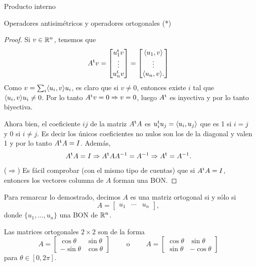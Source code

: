 \begin{chapter}{Producto interno}
\begin{section}{Operadores antisim\'etricos y operadores ortogonales (*)}
\begin{proof}
            
            Si $v \in \mathbb R^n$, tenemos que 
            $$
            A^{{\operatorname{t}}}v = \begin{bmatrix}
            u_1^{{\operatorname{t}}}v \\ \vdots \\ u_n^{{\operatorname{t}}}v 
            \end{bmatrix} = 
            \begin{bmatrix}
            \langle u_1, v \rangle \\ \vdots \\ \langle u_n, v \rangle.
            \end{bmatrix}
            $$
            Como $v = \sum_i \langle u_i, v \rangle u_i$, es claro que si $v \ne 0$, entonces existe $i$ tal que $\langle u_i, v \rangle u_i \ne 0$. Por lo tanto $A^{{\operatorname{t}}}v=0 \Rightarrow v=0$, luego $A^{{\operatorname{t}}}$  es inyectiva y por lo tanto biyectiva.
            
        Ahora bien,  el coeficiente $ij$  de la matriz $A^{{\operatorname{t}}}A$ es $u_i^{{\operatorname{t}}}u_j = \langle u_i,u_j\rangle$ que es 1 si $i=j$ y 0 si $i\ne j$. Es decir los únicos coeficientes no nulos son los de la diagonal y valen 1 y por lo tanto $A^{{\operatorname{t}}}A=I$. Además, $$A^{{\operatorname{t}}}A = I \Rightarrow A^{{\operatorname{t}}}AA^{-1} = A^{-1} \Rightarrow A^{{\operatorname{t}}} = A^{-1}.$$ 
        
        ($\Rightarrow$) Es fácil comprobar (con el mismo tipo de cuentas) que si $A^{{\operatorname{t}}}A=I$, entonces los vectores columna de $A$ forman una BON.
        
        \end{proof}
        
        Para remarcar lo demostrado, decimos  $A$ es una matriz ortogonal si y sólo si
        $$ A = \begin{bmatrix}
        u_1 & \cdots & u_n
        \end{bmatrix}, 
        $$
        donde  $\{u_1,\ldots,u_n\}$ una BON de $\mathbb R^n$.
        
        \begin{ejemplo*}
            Las matrices ortogonales $2 \times 2$ son de la forma
            $$
            A = \begin{bmatrix}
            \cos\theta &\sin\theta \\
            -\sin\theta & \cos\theta
            \end{bmatrix} \qquad\text{ o }\qquad 
            A = \begin{bmatrix}
            \cos\theta &\sin\theta \\
            \sin\theta & -\cos\theta
            \end{bmatrix}
            $$
            para $\theta \in [0,2\pi]$. 
        \end{ejemplo*}
        

\end{section}
\end{chapter}
